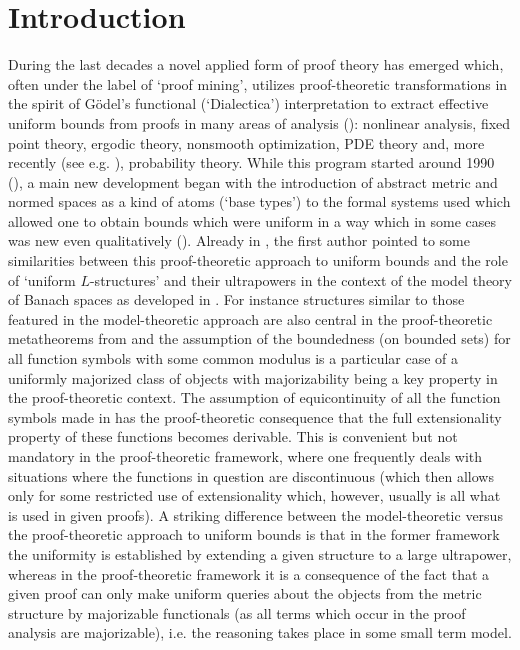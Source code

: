 \documentclass[11pt]{amsart}
\theoremstyle{definition}
\theoremstyle{remark}
\begin{document}
\section{Introduction}
During the last decades a novel applied
form of proof theory has emerged which, often under the label of `proof mining',
utilizes proof-theoretic transformations in the spirit of G\"odel's functional
(`Dialectica') interpretation to extract effective uniform bounds from proofs
in many areas of analysis (\cite{Kohlenbach2008,kohlenbach:19:nonlinear:icm}): nonlinear analysis, fixed point theory, ergodic
theory, nonsmooth optimization, PDE theory and, more recently (see e.g. \cite{NeriOlivaPischke2026,neri-pischke:24:formal:pub}), probability
theory. While this program started around 1990 (\cite{Kohlenbach(90)}), a main new development began
with the introduction of abstract metric and normed spaces as a kind of
atoms (`base types') to the formal systems used which allowed one to obtain
bounds which were uniform in a way which in some cases was new even qualitatively (\cite{kohlenbach2005some,GeK2008}). Already in \cite{kohlenbach2005some}, the
first author pointed to some similarities between this proof-theoretic
approach to uniform bounds and the role of `uniform $L$-structures' and their
ultrapowers in the context of the model theory of Banach spaces as developed
in \cite{henson2002ultraproducts}. For instance structures similar to those
featured in the model-theoretic approach are also central in the
proof-theoretic metatheorems from \cite{kohlenbach2005some,GeK2008}
and the assumption of the boundedness (on bounded sets) for all
function symbols with some common modulus
is a particular case of a uniformly majorized class of objects with
majorizability being a key property in the proof-theoretic context.
The assumption of equicontinuity of all the function symbols made in
\cite{henson2002ultraproducts} has the proof-theoretic consequence that
the full extensionality property of these functions becomes derivable.
This is convenient but not mandatory in the proof-theoretic framework, where one frequently deals with situations where the functions in question are
discontinuous (which then allows only for some restricted use of
extensionality which, however, usually is all what is used in given proofs).
A striking
difference between the model-theoretic versus the proof-theoretic approach
to uniform bounds is that in the former framework the uniformity is
established by extending a given structure to a large ultrapower, whereas
in the proof-theoretic framework it is a consequence of the fact that a given
proof can only make uniform queries about the objects from
the metric structure by majorizable functionals (as all terms which occur
in the proof analysis are majorizable), i.e. the reasoning takes place
in some small term model.\\
\end{document}

